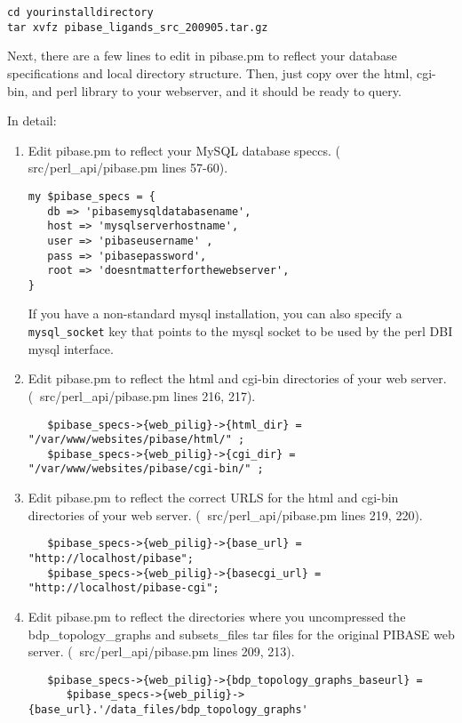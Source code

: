 \documentclass[11pt]{article}
\begin{document}
\begin{verbatim}
cd yourinstalldirectory
tar xvfz pibase_ligands_src_200905.tar.gz
\end{verbatim}

Next, there are a few lines to edit in pibase.pm to reflect your database specifications and local directory structure. Then, just copy over the html, cgi-bin, and perl library to your webserver, and it should be ready to query.

In detail:

\begin{enumerate}
\item Edit pibase.pm to reflect your MySQL database speccs. ($~$ src/perl\_api/pibase.pm lines 57-60).

\begin{verbatim}
my $pibase_specs = {
   db => 'pibasemysqldatabasename',
   host => 'mysqlserverhostname',
   user => 'pibaseusername' ,
   pass => 'pibasepassword',
   root => 'doesntmatterforthewebserver',
}
\end{verbatim}

If you have a non-standard mysql installation, you can also specify a {\tt mysql\_socket} key that points to the mysql socket to be used by the perl DBI mysql interface.

\item Edit pibase.pm to reflect the html and cgi-bin directories of your web server. ($~$ src/perl\_api/pibase.pm lines 216, 217).
\begin{verbatim}
   $pibase_specs->{web_pilig}->{html_dir} = "/var/www/websites/pibase/html/" ;
   $pibase_specs->{web_pilig}->{cgi_dir} = "/var/www/websites/pibase/cgi-bin/" ;
\end{verbatim}

\item Edit pibase.pm to reflect the correct URLS for the html and cgi-bin directories of your web server. ($~$ src/perl\_api/pibase.pm lines 219, 220).
\begin{verbatim}
   $pibase_specs->{web_pilig}->{base_url} = "http://localhost/pibase";
   $pibase_specs->{web_pilig}->{basecgi_url} = "http://localhost/pibase-cgi";
\end{verbatim}

\item Edit pibase.pm to reflect the directories where you uncompressed the bdp\_topology\_graphs and subsets\_files tar files for the original PIBASE web server. ($~$ src/perl\_api/pibase.pm lines 209, 213).
\begin{verbatim}
   $pibase_specs->{web_pilig}->{bdp_topology_graphs_baseurl} =
      $pibase_specs->{web_pilig}->{base_url}.'/data_files/bdp_topology_graphs' 


\end{verbatim}
\end{enumerate}
\end{document}
